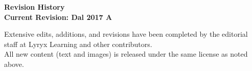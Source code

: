\thispagestyle{plain}


\setlength{\parskip}{0pt}

\begin{center}
\fontsize{14pt}{16pt}\selectfont\textcolor{titletextcolour}{\textbf{Revision History \\ \smallskip  Current Revision: Dal 2017 A }}
\end{center}

{\footnotesize

\begin{center}
Extensive edits, additions, and revisions have been completed by the editorial staff at Lyryx Learning and other contributors.\\
All new content (text and images) is released under the same license as noted above.
\end{center}

}
